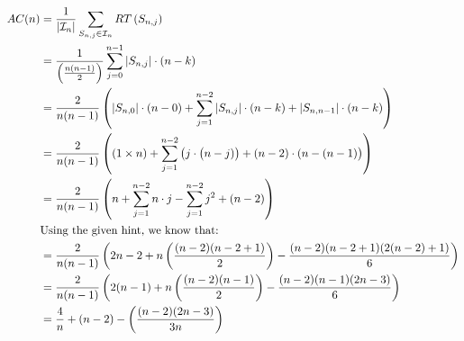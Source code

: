 \documentclass[12pt]{article}
\theoremstyle{definition}
\begin{document}
\begin{enumerate}[(a)]
        \begin{align*}
        AC(n) &=\frac{1}{\left|\mathcal{I}_n\right|} \sum_{S_{n, j} \in \mathcal{I}_n} R T\left(S_{n, j}\right) \\
        &=\frac{1}{\left(\frac{n(n-1)}{2}\right)} \sum_{j=0}^{n-1}\left|S_{n, j}\right| \cdot (n-k) \\
        &=\frac{2}{n(n-1)}\left(\left|S_{n, 0}\right| \cdot (n-0)+\sum_{j=1}^{n-2}\left|S_{n, j}\right| \cdot (n-k)+\left|S_{n, n-1}\right| \cdot (n-k)\right) \\
        &=\frac{2}{n(n-1)}\left((1 \times n)+\sum_{j=1}^{n-2} \left(j \cdot \big(n-j)\right)+(n-2)\cdot(n-(n-1)\big)\right) \\
        &=\frac{2}{n(n-1)}\left(n+\sum_{j=1}^{n-2} n \cdot j-\sum_{j=1}^{n-2} j^{2}+(n-2)\right)  \\ 
        &\text{Using the given hint, we know that:}\\
        &=\frac{2}{n(n-1)}\left(2 n-2+n\left(\frac{(n-2)(n-2+1)}{2}\right)-\frac{(n-2)(n-2+1)(2(n-2)+1)}{6}\right)\\
        &=\frac{2}{n(n-1)}\left(2(n-1)+n\left(\frac{(n-2)(n-1)}{2}\right)-\frac{(n-2)(n-1)(2 n-3)}{6}\right) \\
        &=\frac{4}{n}+(n-2)-\left(\frac{(n-2)(2 n-3)}{3 n}\right)
        \end{align*}

\end{enumerate}
\end{document}
